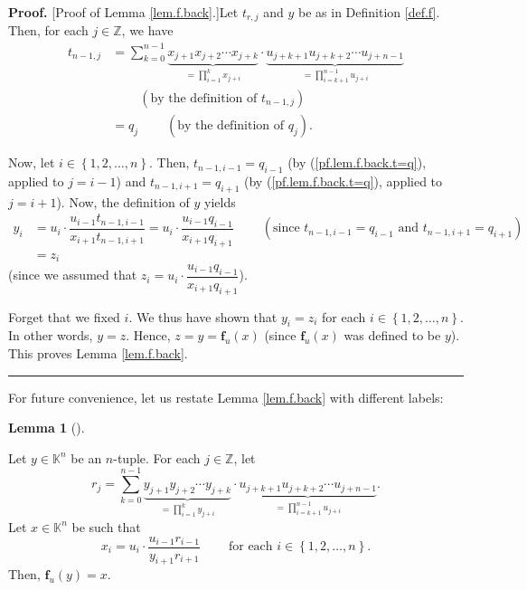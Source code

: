 \documentclass[numbers=enddot,12pt,final,onecolumn,notitlepage]{scrartcl}%
\theoremstyle{definition}
\newtheorem{lem}[theo]{Lemma}
\newenvironment{lemma}[1][]
{\begin{lem}[#1]\begin{leftbar}}
{\end{leftbar}\end{lem}}
\newenvironment{proof}[1][Proof]{\noindent\textbf{#1.} }{\ \rule{0.5em}{0.5em}}
\let\sumnonlimits\sum
\let\prodnonlimits\prod
\renewcommand{\sum}{\sumnonlimits\limits}
\renewcommand{\prod}{\prodnonlimits\limits}
\newenvironment{verlong}{}{}
\begin{document}
\begin{verlong}


\begin{proof}
[Proof of Lemma \ref{lem.f.back}.]Let $t_{r,j}$ and $y$ be as in Definition
\ref{def.f}. Then, for each $j\in\mathbb{Z}$, we have%
\begin{align}
t_{n-1,j}  &  =\sum_{k=0}^{n-1}\underbrace{x_{j+1}x_{j+2}\cdots x_{j+k}%
}_{=\prod_{i=1}^{k}x_{j+i}}\cdot\underbrace{u_{j+k+1}u_{j+k+2}\cdots
u_{j+n-1}}_{=\prod_{i=k+1}^{n-1}u_{j+i}}\nonumber\\
&  \ \ \ \ \ \ \ \ \ \ \left(  \text{by the definition of }t_{n-1,j}\right)
\nonumber\\
&  =q_{j}\ \ \ \ \ \ \ \ \ \ \left(  \text{by the definition of }q_{j}\right)
. \label{pf.lem.f.back.t=q}%
\end{align}


Now, let $i\in\left\{  1,2,\ldots,n\right\}  $. Then, $t_{n-1,i-1}=q_{i-1}$
(by (\ref{pf.lem.f.back.t=q}), applied to $j=i-1$) and $t_{n-1,i+1}=q_{i+1}$
(by (\ref{pf.lem.f.back.t=q}), applied to $j=i+1$). Now, the definition of $y$
yields%
\begin{align*}
y_{i}  &  =u_{i}\cdot\dfrac{u_{i-1}t_{n-1,i-1}}{x_{i+1}t_{n-1,i+1}}=u_{i}%
\cdot\dfrac{u_{i-1}q_{i-1}}{x_{i+1}q_{i+1}}\ \ \ \ \ \ \ \ \ \ \left(
\text{since }t_{n-1,i-1}=q_{i-1}\text{ and }t_{n-1,i+1}=q_{i+1}\right) \\
&  =z_{i}%
\end{align*}
(since we assumed that $z_{i}=u_{i}\cdot\dfrac{u_{i-1}q_{i-1}}{x_{i+1}q_{i+1}%
}$).

Forget that we fixed $i$. We thus have shown that $y_{i}=z_{i}$ for each
$i\in\left\{  1,2,\ldots,n\right\}  $. In other words, $y=z$. Hence,
$z=y=\mathbf{f}_{u}\left(  x\right)  $ (since $\mathbf{f}_{u}\left(  x\right)
$ was defined to be $y$). This proves Lemma \ref{lem.f.back}.
\end{proof}
\end{verlong}

For future convenience, let us restate Lemma \ref{lem.f.back} with different labels:

\begin{lemma}
\label{lem.f.back-y}Let $y\in\mathbb{K}^{n}$ be an $n$-tuple. For each
$j\in\mathbb{Z}$, let
\[
r_{j}=\sum_{k=0}^{n-1}\underbrace{y_{j+1}y_{j+2}\cdots y_{j+k}}_{=\prod
_{i=1}^{k}y_{j+i}}\cdot\underbrace{u_{j+k+1}u_{j+k+2}\cdots u_{j+n-1}}%
_{=\prod_{i=k+1}^{n-1}u_{j+i}}.
\]
Let $x\in\mathbb{K}^{n}$ be such that%
\[
x_{i}=u_{i}\cdot\dfrac{u_{i-1}r_{i-1}}{y_{i+1}r_{i+1}}%
\ \ \ \ \ \ \ \ \ \ \text{for each }i\in\left\{  1,2,\ldots,n\right\}  .
\]
Then, $\mathbf{f}_{u}\left(  y\right)  =x$.
\end{lemma}
\end{document}
